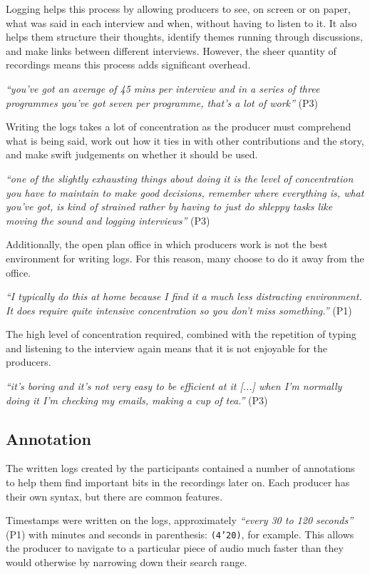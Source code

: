 Logging helps this process by allowing producers to see, on screen or on paper,
what was said in each interview and when, without having to listen to it. It
also helps them structure their thoughts, identify themes running through
discussions, and make links between different interviews. However, the sheer
quantity of recordings means this process adds significant overhead.

\textit{``you've got an average of 45 mins per interview and in a series of
  three programmes you've got seven per programme, that's a lot of work''} (P3)

Writing the logs takes a lot of concentration as the producer must comprehend
what is being said, work out how it ties in with other contributions and the
story, and make swift judgements on whether it should be used.

\textit{``one of the slightly exhausting things about doing it is the level of
  concentration you have to maintain to make good decisions, remember where
  everything is, what you've got, is kind of strained rather by having to just
  do shleppy tasks like moving the sound and logging interviews''} (P3)

Additionally, the open plan office in which producers work is not the best
environment for writing logs. For this reason, many choose to do it away from
the office. 

\textit{``I typically do this at home because I find it a much less distracting
  environment. It does require quite intensive concentration so you don't miss
  something.''} (P1)

The high level of concentration required, combined with the repetition of 
typing and listening to the interview again means that it is not enjoyable for
the producers.

\textit{``it's boring and it's not very easy to be efficient at it [...] when
  I'm normally doing it I'm checking my emails, making a cup of tea.''} (P3)

\subsection{Annotation}
The written logs created by the participants contained a number of annotations
to help them find important bits in the recordings later on. Each producer has
their own syntax, but there are common features.

Timestamps were written on the logs, approximately \textit{``every 30 to 120
  seconds''} (P1) with minutes and seconds in parenthesis: \texttt{(4'20)},
for example.  This allows the producer to navigate to a particular piece of
audio much faster than they would otherwise by narrowing down their search
range.

